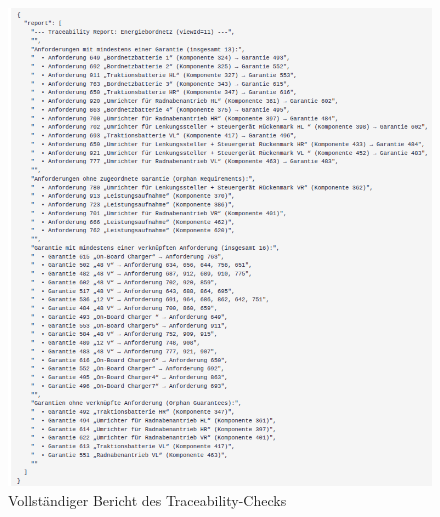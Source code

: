\begin{figure}
  \centering
  \includegraphics[width=\textwidth]{figures/06Evaluation/Bildschirmfoto vom 2025-06-29 13-23-12.png}
  \caption{Vollständiger Bericht des Traceability-Checks}
  \label{fig:fullresult}
\end{figure}